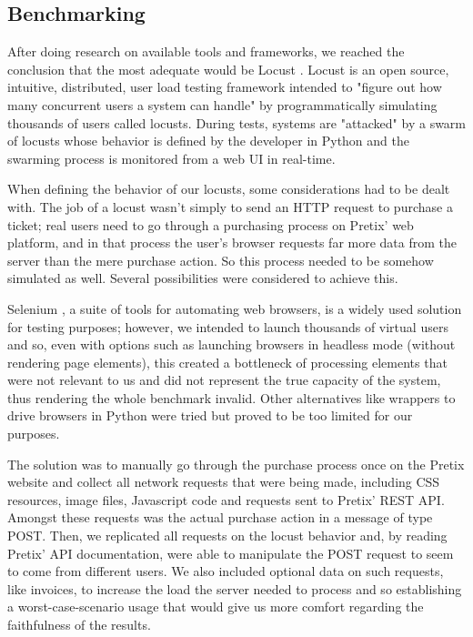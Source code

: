 \documentclass[12pt]{article}
\begin{document}
\subsection{Benchmarking} \label{performance.benchmarking} %


After doing research on available tools and frameworks, we reached the conclusion that the most adequate would be Locust \cite{locust}.
Locust is an open source, intuitive, distributed, user load testing framework intended to "figure out how many concurrent users a system can handle" by 
programmatically simulating thousands of users called locusts.
During tests, systems are "attacked" by a swarm of locusts whose behavior is defined by the developer in Python and the swarming process is monitored from a 
web UI in real-time. 

When defining the behavior of our locusts, some considerations had to be dealt with.
The job of a locust wasn't simply to send an HTTP request to purchase a ticket; real users need to go through a purchasing process on Pretix' web platform, and 
in that process the user's browser requests far more data from the server than the mere purchase action.
So this process needed to be somehow simulated as well.
Several possibilities were considered to achieve this.

Selenium \cite{selenium}, a suite of tools for automating web browsers, is a widely used solution for testing purposes; however, we intended to launch thousands 
of virtual users and so, even with options such as launching browsers in headless mode (without rendering page elements), this created a bottleneck of processing 
elements that were not relevant to us and did not represent the true capacity of the system, thus rendering the whole benchmark invalid.
Other alternatives like wrappers to drive browsers in Python were tried but proved to be too limited for our purposes.

The solution was to manually go through the purchase process once on the Pretix website and collect all network requests that were being made, including CSS 
resources, image files, Javascript code and requests sent to Pretix' REST API.
Amongst these requests was the actual purchase action in a message of type POST.
Then, we replicated all requests on the locust behavior and, by reading Pretix' API documentation, were able to manipulate the POST request to seem to come 
from different users.
We also included optional data on such requests, like invoices, to increase the load the server needed to process and so establishing a worst-case-scenario usage 
that would give us more comfort regarding the faithfulness of the results.
\end{document}
